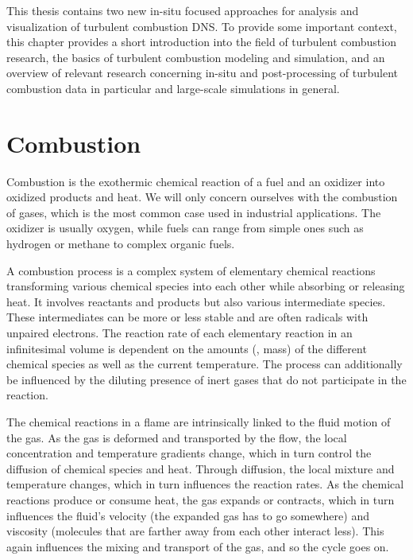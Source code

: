 %
This thesis contains two new in-situ focused approaches for analysis and
visualization of turbulent combustion \ac{DNS}.
%
To provide some important context, this chapter provides a short introduction
into the field of turbulent combustion research, the basics of turbulent
combustion modeling and simulation, and an overview of relevant research
concerning in-situ and post-processing of turbulent combustion data in
particular and large-scale simulations in general.
%

\section{Combustion} %
\label{sec:combustion}
%
Combustion is the exothermic chemical reaction of a fuel and an oxidizer into
oxidized products and heat.
%
We will only concern ourselves with the combustion of gases, which is the
most common case used in industrial applications.
%
The oxidizer is usually oxygen, while fuels can range from simple ones such as
hydrogen or methane to complex organic fuels.
%

%
A combustion process is a complex system of elementary chemical reactions
transforming various chemical species into each other while absorbing or
releasing heat.
%
It involves reactants and products but also various intermediate species.
%
These intermediates can be more or less stable and are often radicals with
unpaired electrons.
%
The reaction rate of each elementary reaction in an infinitesimal volume is
dependent on the amounts (\ie, mass) of the different chemical species as well
as the current temperature.
%
The process can additionally be influenced by the diluting presence of inert
gases that do not participate in the reaction.
%

%
The chemical reactions in a flame are intrinsically linked to the fluid motion
of the gas.
%
As the gas is deformed and transported by the flow, the local concentration and
temperature gradients change, which in turn control the diffusion of chemical
species and heat.
%
Through diffusion, the local mixture and temperature changes, which in turn
influences the reaction rates.
%
As the chemical reactions produce or consume heat, the gas expands or contracts,
which in turn influences the fluid's velocity (the expanded gas has to go
somewhere) and viscosity (molecules that are farther away from each other
interact less).
%
This again influences the mixing and transport of the gas, and so the cycle goes
on.
%

